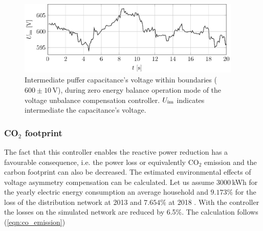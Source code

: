             \begin{figure}[ht]
            \centering
            \includegraphics[width=0.95\textwidth]{Unblance_EPS_Pics/UnbalRedComp_JCP-figure7.eps}
                 \caption{Intermediate puffer capacitance's voltage within boundaries ($600\pm10$\,V), during zero energy balance operation mode of the voltage unbalance compensation controller. $U_{\textnormal{im}}$ indicates intermediate the capacitance's voltage.}
                 \label{fig:u_inter}
                \end{figure}

%

        \subsubsection[CO2 footprint]{CO$_2$ footprint}\label{VUB:sec:CO2}

            The fact that this controller enables the reactive power reduction has a favourable consequence, i.e. the power loss or equivalently CO$_2$ emission and the carbon footprint can also be decreased. The estimated environmental effects of voltage asymmetry compensation can be calculated. Let us assume 3000\,kWh for the yearly electric energy consumption an average household and $9.173\%$ for the loss of the distribution network at 2013 \cite{MVM2013} and $7.654\%$ at 2018 \cite{MVM2018}. With the controller the losses on the simulated network are reduced by 6.5\%. The calculation follows (\ref{eqn:co_emission})

